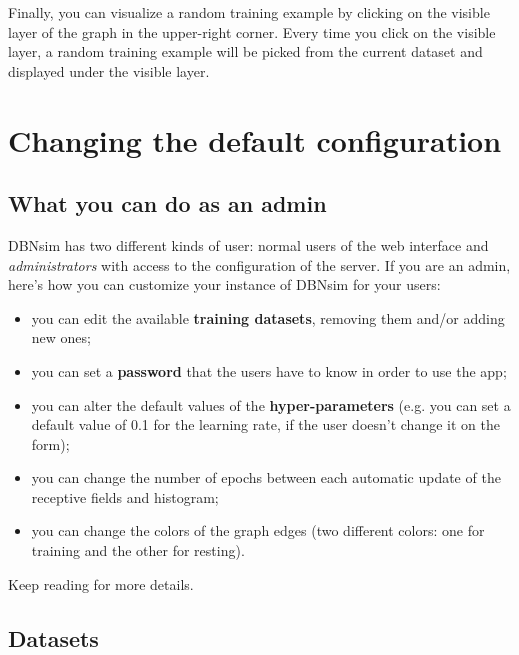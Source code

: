 \documentclass[a4paper]{article}
\begin{document}
		
Finally, you can visualize a random training example by clicking on the visible layer of the graph in the upper-right corner. Every time you click on the visible layer, a random training example will be picked from the current dataset and displayed under the visible layer.
	


		
	\section{Changing the default configuration}


		
	\subsection{What you can do as an admin}

		
DBNsim has two different kinds of user: normal users of the web interface and \emph{administrators} with access to the configuration of the server. If you are an admin, here's how you can customize your instance of DBNsim for your users:
		
	\begin{itemize}
		
			
	\item you can edit the available \textbf{training datasets}, removing them and/or adding new ones;
			
	\item you can set a \textbf{password} that the users have to know in order to use the app;
			
	\item you can alter the default values of the \textbf{hyper-parameters} (e.g. you can set a default value of 0.1 for the learning rate, if the user doesn't change it on the form);
			
	\item you can change the number of epochs between each automatic update of the receptive fields and histogram;
			
	\item you can change the colors of the graph edges (two different colors: one for training and the other for resting).
		
	\end{itemize}

		
Keep reading for more details.

		
	\subsection{Datasets}
\end{document}

